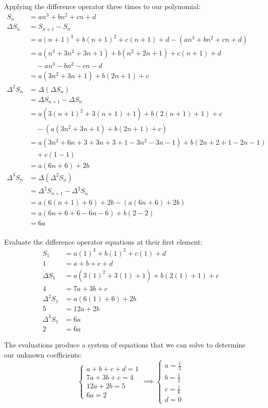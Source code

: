 \documentclass{article}
\begin{document}
Applying the difference operator three times to our polynomial:
\[\begin{aligned}
    S_n &= an^3+bn^2+cn+d \\
    \Delta S_n &= S_{n+1} - S_n \\
    &= a(n+1)^3 + b(n+1)^2 + c(n+1) + d - (an^3 + bn^2 + cn + d) \\
    &= a(n^3 + 3n^2 + 3n + 1) + b(n^2 + 2n + 1) + c(n+1) + d \\
    & \quad - an^3 - bn^2 - cn - d \\
    &= a(3n^2+3n+1)+b(2n+1)+c \\
    \Delta^2 S_n &= \Delta (\Delta S_n) \\
    &= \Delta S_{n+1} - \Delta S_n \\
    &= a(3(n+1)^2 + 3(n+1) + 1) + b(2(n+1)+1) + c \\
    & \quad - (a(3n^2+3n+1)+b(2n+1)+c) \\
    &= a(3n^2 + 6n + 3 + 3n + 3 + 1 -3n^2 -3n -1) + b(2n + 2 + 1 - 2n - 1) \\
    & \quad + c(1-1) \\
    &= a(6n+6) + 2b \\
    \Delta^3 S_n &= \Delta(\Delta^2 S_n) \\
    &= \Delta^2 S_{n+1} - \Delta^2 S_n \\
    &= a(6(n+1)+6) + 2b - (a(6n + 6) + 2b) \\
    &= a(6n + 6 + 6 -6n -6) + b(2 - 2) \\
    &= 6a \\
\end{aligned}\]

Evaluate the difference operator equations at their first element:
\[\begin{aligned}
    S_1 &= a(1)^3+b(1)^2+c(1)+d \\
    1 &= a + b + c + d \\
    \Delta S_1 &= a(3(1)^2+3(1)+1)+b(2(1)+1)+c \\
    4 &= 7a + 3b + c \\
    \Delta^2 S_1 &= a(6(1)+6) + 2b \\
    5 &= 12a + 2b \\
    \Delta^3 S_1 &= 6a \\
    2 &= 6a
\end{aligned}\]

The evaluations produce a system of equations that we can solve to determine our unknown coefficients:
\[\begin{cases}
    a + b + c + d = 1 \\
    7a + 3b + c = 4 \\
    12a + 2b = 5 \\
    6a = 2
\end{cases}
\implies
\begin{cases}
    a = \frac{1}{3} \\
    b = \frac{1}{2} \\
    c = \frac{1}{6} \\
    d = 0
\end{cases}\]
\end{document}
